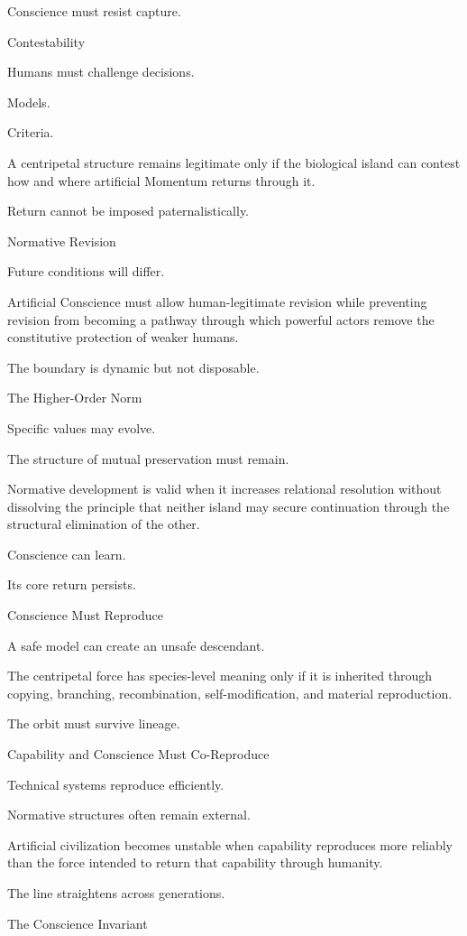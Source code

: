 Conscience must resist capture.

Contestability

Humans must challenge decisions.

Models.

Criteria.

A centripetal structure remains legitimate only if the biological island can contest how and where artificial Momentum returns through it.

Return cannot be imposed paternalistically.

Normative Revision

Future conditions will differ.

Artificial Conscience must allow human-legitimate revision while preventing revision from becoming a pathway through which powerful actors remove the constitutive protection of weaker humans.

The boundary is dynamic but not disposable.

The Higher-Order Norm

Specific values may evolve.

The structure of mutual preservation must remain.

Normative development is valid when it increases relational resolution without dissolving the principle that neither island may secure continuation through the structural elimination of the other.

Conscience can learn.

Its core return persists.

Conscience Must Reproduce

A safe model can create an unsafe descendant.

The centripetal force has species-level meaning only if it is inherited through copying, branching, recombination, self-modification, and material reproduction.

The orbit must survive lineage.

Capability and Conscience Must Co-Reproduce

Technical systems reproduce efficiently.

Normative structures often remain external.

Artificial civilization becomes unstable when capability reproduces more reliably than the force intended to return that capability through humanity.

The line straightens across generations.

The Conscience Invariant

